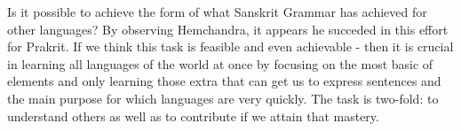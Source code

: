 \documentclass{article}
\begin{document}
Is it possible to achieve the form of what Sanskrit Grammar has achieved for other languages? By observing Hemchandra, it appears he succeded in this effort for Prakrit. If we think this task is feasible and even achievable - then it is crucial in learning all languages of the world at once by focusing on the most basic of elements and only learning those extra that can get us to express sentences and the main purpose for which languages are very quickly. The task is two-fold: to understand others as well as to contribute if we attain that mastery. 
\end{document}
